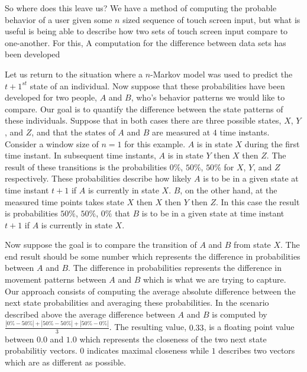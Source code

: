 So where does this leave us?
We have a method of computing the
probable behavior of a user given 
some $n$ sized sequence of touch screen input,
but what is useful is being able to describe
how two sets of touch screen input compare to one-another.
For this,
A computation for the difference between data sets has been developed

Let us return to the situation where
a $n$-Markov model was used to predict the $t+1^{st}$ state
of an individual.
Now suppose that these probabilities have been developed for
two people, $A$ and $B$, who's behavior patterns we would like to
compare.
Our goal is to quantify the difference between
the state patterns of these individuals.
Suppose that in both cases there are three possible states,
$X$, $Y$, and $Z$, and
that the states of $A$ and $B$ are measured at $4$ time instants.
Consider a window size of $n=1$ for this example.
%
$A$ is in state $X$ during the first time instant.
In subsequent time instants,
$A$ is in state $Y$ then $X$ then $Z$.
The result of these transitions is 
the probabilities $0\%$, $50\%$, $50\%$
for $X$, $Y$, and $Z$ respectively.
%
These probabilities describe how likely
$A$ is to be in a given state at time instant $t+1$
if $A$ is currently in state $X$.
%
$B$, on the other hand,
at the measured time points takes state
$X$ then $X$ then $Y$ then $Z$.
In this case the
result is probabilities $50\%$, $50\%$, $0\%$ 
that $B$ is to be in a given state at time instant $t+1$
if $A$ is currently in state $X$.
%

Now suppose the goal is to compare the 
transition of $A$ and $B$ from state $X$.
The end result should be some number which represents
the difference in probabilities between $A$ and $B$.
The difference in probabilities represents 
the difference in movement patterns between $A$ and $B$
which is what we are trying to capture.
%
Our approach consists of computing
the average absolute difference between the 
next state probabilities
and averaging these probabilities.
%
In the scenario described above
the average difference between $A$ and $B$ 
is computed by
$\frac{|0\%-50\%| + |50\%-50\%| + |50\%-0\%|}{3}$.
The resulting value, $0.33$, is a floating point value
between $0.0$ and $1.0$ which represents
the closeness of the two next state probabilitiy vectors.
$0$ indicates maximal closeness while
$1$ describes two vectors which are as different as possible.
%

